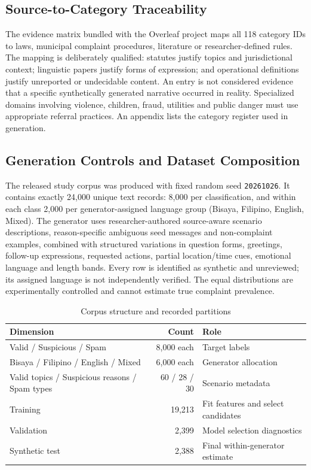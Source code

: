 \subsection{Source-to-Category Traceability}
The evidence matrix bundled with the Overleaf project maps all 118 category IDs to laws, municipal complaint procedures, literature or researcher-defined rules. The mapping is deliberately qualified: statutes justify topics and jurisdictional context; linguistic papers justify forms of expression; and operational definitions justify unreported or undecidable content. An entry is not considered evidence that a specific synthetically generated narrative occurred in reality. Specialized domains involving violence, children, fraud, utilities and public danger must use appropriate referral practices. An appendix lists the category register used in generation.

\subsection{Generation Controls and Dataset Composition}
The released study corpus was produced with fixed random seed \texttt{20261026}. It contains exactly 24,000 unique text records: 8,000 per classification, and within each class 2,000 per generator-assigned language group (Bisaya, Filipino, English, Mixed). The generator uses researcher-authored source-aware scenario descriptions, reason-specific ambiguous seed messages and non-complaint examples, combined with structured variations in question forms, greetings, follow-up expressions, requested actions, partial location/time cues, emotional language and length bands. Every row is identified as synthetic and unreviewed; its assigned language is not independently verified. The equal distributions are experimentally controlled and cannot estimate true complaint prevalence.
\begin{table}[H]\centering\caption{Corpus structure and recorded partitions}\begin{tabularx}{\textwidth}{p{}rX}\toprule
\textbf{Dimension}&\textbf{Count}&\textbf{Role}\\\midrule
Valid / Suspicious / Spam&8,000 each&Target labels\\
Bisaya / Filipino / English / Mixed&6,000 each&Generator allocation\\
Valid topics / Suspicious reasons / Spam types&60 / 28 / 30&Scenario metadata\\
Training&19,213&Fit features and select candidates\\
Validation&2,399&Model selection diagnostics\\
Synthetic test&2,388&Final within-generator estimate\\\bottomrule\end{tabularx}\end{table}

